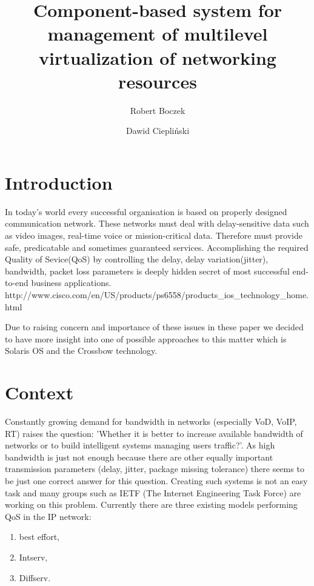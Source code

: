 \documentclass[11pt]{book}
\title{Component-based system for management of multilevel virtualization of networking resources}
\author{Robert Boczek \and Dawid Ciepliński}
\begin{document}
  \maketitle
    
  \tableofcontents


  \chapter{Introduction}

	
	In today's world every successful organisation is based on properly designed communication network. These networks
	must deal with delay-sensitive data such as video images, real-time voice or mission-critical data. Therefore
	must provide safe, predicatable and sometimes guaranteed services. Accomplishing the required Quality of 
	Sevice(QoS) by controlling the delay, delay variation(jitter), bandwidth, packet loss parameters is deeply 
	hidden secret of most successful end-to-end business applications. 
	http://www.cisco.com/en/US/products/ps6558/products\_ios\_technology\_home.html
	
	
	Due to raising concern and importance of these issues in these paper we decided to have more insight into one of 
	possible approaches	to this matter which is Solaris OS and the Crossbow technology. 


  \chapter{Context}  %

	Constantly growing demand for bandwidth in networks (especially VoD, VoIP, RT) raises the question: 'Whether it 
	is better to increase available bandwidth of networks or to build intelligent systems managing users traffic?'. 
	As high bandwidth is just not enough because there are other equally important transmission parameters (delay,
	jitter, package missing	tolerance) there seems to be just one correct answer for this question. Creating
	such systems is not an easy task and many groups such as IETF (The Internet Engineering Task Force) are working on this problem. 
	Currently there are three existing models performing QoS in the IP network:

	\begin{enumerate}
    \item best effort,
		\item Intserv,
		\item Diffserv.
	\end{enumerate}
	
\end{document}

